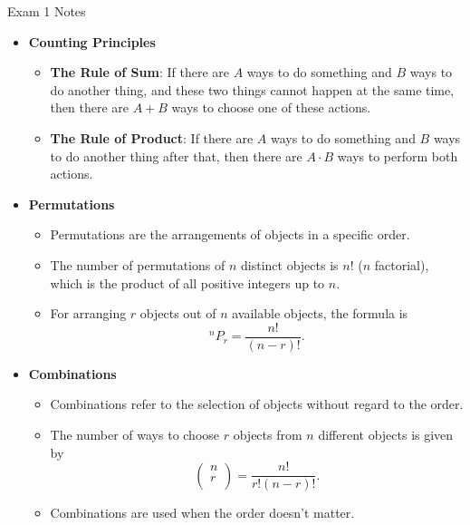 \begin{examnotes}{Exam 1 Notes}
    \begin{itemize}
        \item \textbf{Counting Principles}
        \begin{itemize}
            \item \textbf{The Rule of Sum}: If there are $A$ ways to do something and $B$ ways to do another thing, and these two things cannot happen at the same time, then there are $A + B$ ways 
            to choose one of these actions.
            \item \textbf{The Rule of Product}: If there are $A$ ways to do something and $B$ ways to do another thing after that, then there are $A \cdot B$ ways to perform both actions.
        \end{itemize}
        \item \textbf{Permutations}
        \begin{itemize}
            \item Permutations are the arrangements of objects in a specific order.
            \item The number of permutations of $n$ distinct objects is $n!$ ($n$ factorial), which is the product of all positive integers up to $n$.
            \item For arranging $r$ objects out of $n$ available objects, the formula is
            \begin{equation*}
                ^{n}P_{r} = \frac{n!}{(n - r)!}.
            \end{equation*}
        \end{itemize}
        \item \textbf{Combinations}
        \begin{itemize}
            \item Combinations refer to the selection of objects without regard to the order.
            \item The number of ways to choose $r$ objects from $n$ different objects is given by 
            \begin{equation*}
                \begin{pmatrix}
                    n \\
                    r \\
                \end{pmatrix}
                = \frac{n!}{r!(n - r)!}.
            \end{equation*}
            \item Combinations are used when the order doesn't matter.
        \end{itemize}

\end{itemize}
\end{examnotes}
